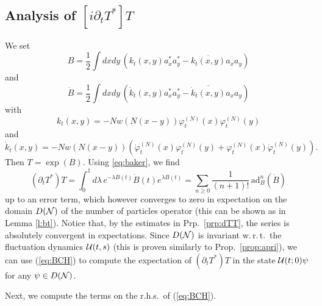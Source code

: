 \documentclass[11pt,a4paper]{article}
\newcommand{\done}{}
\newcommand{\cU}{{\cal U}}
\newcommand{\cN}{{\cal N}}
\newcommand{\ad}{\operatorname{ad}}	%
\newcommand{\di}{{d}}		%
\begin{document}
\subsection{Analysis of $[i \partial_t T^*] T$}

We set 
\[ B = \frac{1}{2} \int dx dy \, \left( k_t (x,y) a_x^* a_y^* - \overline{k_t (x,y)} a_x a_y \right) \]
and 
\[ \dot{B} =  \frac{1}{2} \int dx dy \, \left( \dot{k}_t (x,y) a_x^* a_y^* - \overline{\dot{k}_t (x,y)} a_x a_y \right) \]
with 
\[ k_t (x,y) = -N w(N(x-y)) \varphi_t^{(N)} (x) \varphi_t^{(N)} (y) \]
and
\[ \dot{k}_t (x,y) = - N w (N (x-y))  \left( \dot{\varphi}_t^{(N)} (x) \varphi_t^{(N)} (y) + \varphi_t^{(N)} (x) \dot{\varphi}_t^{(N)} (y) \right). \]
Then $T = \exp (B)$. Using \eqref{eq:baker}, we find%
\begin{equation}\label{eq:BCH} \left(\partial_t T^* \right) T = \int_0^1 \di\lambda\, e^{-\lambda B(t)} \dot B(t) e^{\lambda B(t)} = \sum_{n \geq 0} \frac{1}{(n+1)!}\,  \text{ad}^n_{B} (\dot{B}) \end{equation}
up to an error term, which however converges to zero in expectation on the domain $D(\cN)$ of the number of particles operator (this can be shown as in Lemma \ref{l:bt}). Notice that, by the estimates in Prp.\ \ref{prp:dTT}, the series is absolutely convergent in expectations. Since $D(\cN)$ is invariant w.\,r.\,t.\ the fluctuation dynamics $\cU (t,s)$ (this is proven similarly to Prop.\ \ref{prop:apri})\done{}, we can use (\ref{eq:BCH}) to compute the expectation of $(\partial_t T^*) T$ in the state $\cU (t;0) \psi$ for any $\psi \in D(\cN)$. 

Next, we compute the terms on the r.h.s.\ of (\ref{eq:BCH}).
\end{document}
